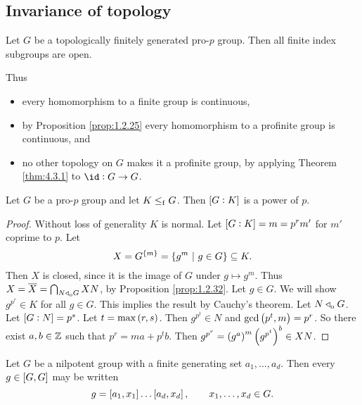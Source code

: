 \subsection{Invariance of topology}

\begin{theorem}[Serre]
\label{thm:4.3.1}
Let $ G $ be a topologically finitely generated pro-$ p $ group. Then all finite index subgroups are open.
\end{theorem}

Thus
\begin{itemize}
\item every homomorphism to a finite group is continuous,
\item by Proposition \ref{prop:1.2.25} every homomorphism to a profinite group is continuous, and
\item no other topology on $ G $ makes it a profinite group, by applying Theorem \ref{thm:4.3.1} to $ \id : G \to G $.
\end{itemize}

\begin{proposition}
Let $ G $ be a pro-$ p $ group and let $ K \le_{\mathrm{f}} G $. Then $ \sbr{G : K} $ is a power of $ p $.
\end{proposition}

\begin{proof}
Without loss of generality $ K $ is normal. Let $ \sbr{G : K} = m = p^rm' $ for $ m' $ coprime to $ p $. Let
$$ X = G^{\cbr{m}} = \cbr{g^m \st g \in G} \subseteq K. $$
Then $ X $ is closed, since it is the image of $ G $ under $ g \mapsto g^m $. Thus $ X = \overline{X} = \bigcap_{N \triangleleft_{\mathrm{o}} G} XN $, by Proposition \ref{prop:1.2.32}. Let $ g \in G $. We will show $ g^{p^r} \in K $ for all $ g \in G $. This implies the result by Cauchy's theorem. Let $ N \triangleleft_{\mathrm{o}} G $. Let $ \sbr{G : N} = p^s $. Let $ t = \max\br{r, s} $. Then $ g^{p^t} \in N $ and $ \gcd\br{p^t, m} = p^r $. So there exist $ a, b \in \mathbb{Z} $ such that $ p^r = ma + p^tb $. Then $ g^{p^r} = \br{g^a}^m\br{g^{p^t}}^b \in XN $.
\end{proof}

\pagebreak

\begin{lemma}
Let $ G $ be a nilpotent group with a finite generating set $ a_1, \dots, a_d $. Then every $ g \in \sbr{G, G} $ may be written
$$ g = \sbr{a_1, x_1} \dots \sbr{a_d, x_d}, \qquad x_1, \dots, x_d \in G. $$
\end{lemma}

